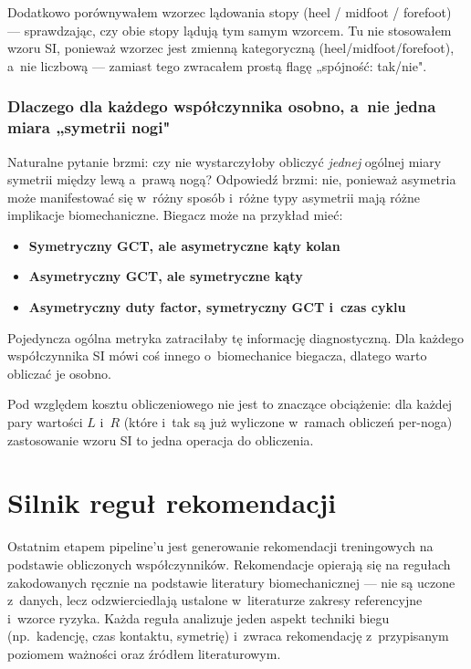 Dodatkowo porównywałem wzorzec lądowania stopy (heel / midfoot / forefoot) --- sprawdzając, czy obie stopy lądują tym samym wzorcem. Tu nie stosowałem wzoru SI, ponieważ wzorzec jest zmienną kategoryczną (heel/midfoot/forefoot), a~nie liczbową --- zamiast tego zwracałem prostą flagę „spójność: tak/nie".

\subsubsection{Dlaczego dla każdego współczynnika osobno, a~nie jedna miara „symetrii nogi"}

Naturalne pytanie brzmi: czy nie wystarczyłoby obliczyć \textit{jednej} ogólnej miary symetrii między lewą a~prawą nogą? Odpowiedź brzmi: nie, ponieważ asymetria może manifestować się w~różny sposób i~różne typy asymetrii mają różne implikacje biomechaniczne. Biegacz może na przykład mieć:

\begin{itemize}
    \item \textbf{Symetryczny GCT, ale asymetryczne kąty kolan}
    \item \textbf{Asymetryczny GCT, ale symetryczne kąty} 
    \item \textbf{Asymetryczny duty factor, symetryczny GCT i~czas cyklu}
\end{itemize}

Pojedyncza ogólna metryka zatraciłaby tę informację diagnostyczną. Dla każdego współczynnika SI mówi coś innego o~biomechanice biegacza, dlatego warto obliczać je osobno.

Pod względem kosztu obliczeniowego nie jest to znaczące obciążenie: dla każdej pary wartości $L$ i~$R$ (które i~tak są już wyliczone w~ramach obliczeń per-noga) zastosowanie wzoru SI to jedna operacja do obliczenia.
\section{Silnik reguł rekomendacji}
\label{sec:silnik-regul}

Ostatnim etapem pipeline'u jest generowanie rekomendacji treningowych na podstawie obliczonych współczynników. Rekomendacje opierają się na regułach zakodowanych ręcznie na podstawie literatury biomechanicznej --- nie są uczone z~danych, lecz odzwierciedlają ustalone w~literaturze zakresy referencyjne i~wzorce ryzyka. Każda reguła analizuje jeden aspekt techniki biegu (np.~kadencję, czas kontaktu, symetrię) i~zwraca rekomendację z~przypisanym poziomem ważności oraz źródłem literaturowym.

